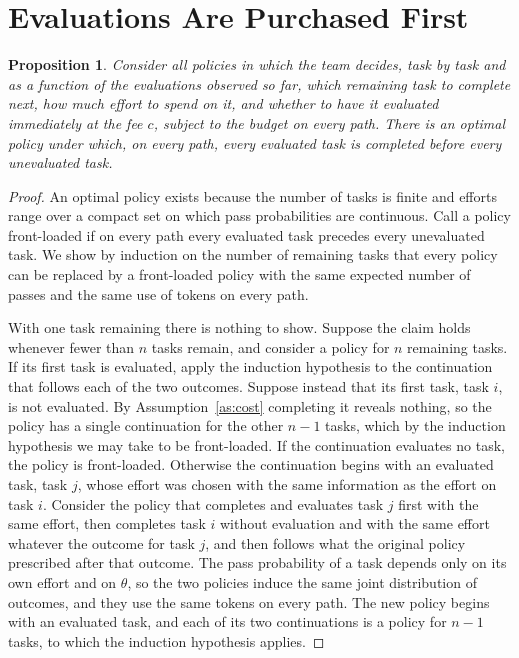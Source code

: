 \documentclass[11pt]{article}
\newtheorem{proposition}{Proposition}
\theoremstyle{definition}
\begin{document}
\section{Evaluations Are Purchased First}

\begin{proposition}\label{prop:front}
Consider all policies in which the team decides, task by task and as a function of the evaluations observed so far, which remaining task to complete next, how much effort to spend on it, and whether to have it evaluated immediately at the fee $c$, subject to the budget on every path. There is an optimal policy under which, on every path, every evaluated task is completed before every unevaluated task.
\end{proposition}

\begin{proof}
An optimal policy exists because the number of tasks is finite and efforts range over a compact set on which pass probabilities are continuous. Call a policy front-loaded if on every path every evaluated task precedes every unevaluated task. We show by induction on the number of remaining tasks that every policy can be replaced by a front-loaded policy with the same expected number of passes and the same use of tokens on every path.

With one task remaining there is nothing to show. Suppose the claim holds whenever fewer than $n$ tasks remain, and consider a policy for $n$ remaining tasks. If its first task is evaluated, apply the induction hypothesis to the continuation that follows each of the two outcomes. Suppose instead that its first task, task $i$, is not evaluated. By Assumption~\ref{as:cost} completing it reveals nothing, so the policy has a single continuation for the other $n-1$ tasks, which by the induction hypothesis we may take to be front-loaded. If the continuation evaluates no task, the policy is front-loaded. Otherwise the continuation begins with an evaluated task, task $j$, whose effort was chosen with the same information as the effort on task $i$. Consider the policy that completes and evaluates task $j$ first with the same effort, then completes task $i$ without evaluation and with the same effort whatever the outcome for task $j$, and then follows what the original policy prescribed after that outcome. The pass probability of a task depends only on its own effort and on $\theta$, so the two policies induce the same joint distribution of outcomes, and they use the same tokens on every path. The new policy begins with an evaluated task, and each of its two continuations is a policy for $n-1$ tasks, to which the induction hypothesis applies.
\end{proof}
\end{document}
